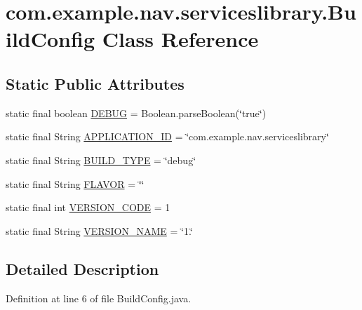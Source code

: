 \hypertarget{classcom_1_1example_1_1nav_1_1serviceslibrary_1_1_build_config}{}\section{com.\+example.\+nav.\+serviceslibrary.\+Build\+Config Class Reference}
\label{classcom_1_1example_1_1nav_1_1serviceslibrary_1_1_build_config}
\subsection*{Static Public Attributes}
\begin{DoxyCompactItemize}
\item 
static final boolean \hyperlink{classcom_1_1example_1_1nav_1_1serviceslibrary_1_1_build_config_a76d11ce41f2c89ba6946665c8c94cd93}{D\+E\+B\+UG} = Boolean.\+parse\+Boolean(\char`\"{}true\char`\"{})
\item 
static final String \hyperlink{classcom_1_1example_1_1nav_1_1serviceslibrary_1_1_build_config_ad63a358f68096901341c7bdab3736531}{A\+P\+P\+L\+I\+C\+A\+T\+I\+O\+N\+\_\+\+ID} = \char`\"{}com.\+example.\+nav.\+serviceslibrary\char`\"{}
\item 
static final String \hyperlink{classcom_1_1example_1_1nav_1_1serviceslibrary_1_1_build_config_a44038c475d2b31701d4ef5a58477436b}{B\+U\+I\+L\+D\+\_\+\+T\+Y\+PE} = \char`\"{}debug\char`\"{}
\item 
static final String \hyperlink{classcom_1_1example_1_1nav_1_1serviceslibrary_1_1_build_config_a27b1af20f76feab6139026ebbd7062b0}{F\+L\+A\+V\+OR} = \char`\"{}\char`\"{}
\item 
static final int \hyperlink{classcom_1_1example_1_1nav_1_1serviceslibrary_1_1_build_config_a081c43fbe8fc5d043ae4dc49a934e399}{V\+E\+R\+S\+I\+O\+N\+\_\+\+C\+O\+DE} = 1
\item 
static final String \hyperlink{classcom_1_1example_1_1nav_1_1serviceslibrary_1_1_build_config_a2824c70d0c2d0027a9d5fdb1cfb5be01}{V\+E\+R\+S\+I\+O\+N\+\_\+\+N\+A\+ME} = \char`\"{}1.\char`\"{}
\end{DoxyCompactItemize}


\subsection{Detailed Description}


Definition at line 6 of file Build\+Config.\+java.



